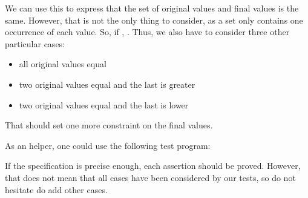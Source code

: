 We can use this to express that the set of original values and final values
is the same. However, that is not the only thing to consider, as a set only
contains one occurrence of each value. So, if ,
. Thus, we also have to consider three
other particular cases:


\begin{itemize}
\item all original values equal
\item two original values equal and the last is greater
\item two original values equal and the last is lower
\end{itemize}


That should set one more constraint on the final values.


As an helper, one could use the following test program:




If the specification is precise enough, each assertion should be proved.
However, that does not mean that all cases have been considered by our tests,
so do not hesitate do add other cases.
